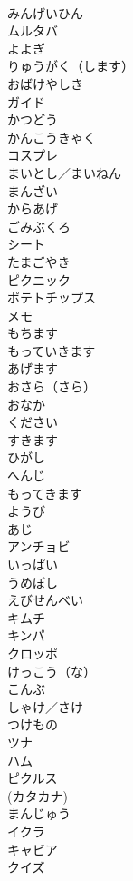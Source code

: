 \documentclass[8pt]{extreport}
\begin{document}
\begin{CJK}{UTF8}{min}
\\	みんげいひん	
\\	ムルタバ	
\\	よよぎ	
\\	りゅうがく（します）	
\\	おばけやしき	
\\	ガイド	
\\	かつどう	
\\	かんこうきゃく	
\\	コスプレ	
\\	まいとし／まいねん	
\\	まんざい	
\\	からあげ	
\\	ごみぶくろ	
\\	シート	
\\	たまごやき	
\\	ピクニック	
\\	ポテトチップス	
\\	メモ	
\\	もちます	
\\	もっていきます	
\\	あげます	
\\	おさら（さら）	
\\	おなか	
\\	ください	
\\	すきます	
\\	ひがし	
\\	へんじ	
\\	もってきます	
\\	ようび	
\\	あじ	
\\	アンチョビ	
\\	いっぱい	
\\	うめぼし	
\\	えびせんべい	
\\	キムチ	
\\	キンパ	
\\	クロッポ	
\\	けっこう（な）	
\\	こんぶ	
\\	しゃけ／さけ	
\\	つけもの	
\\	ツナ	
\\	ハム	
\\	ピクルス	
\\	(カタカナ)
\\	まんじゅう	
\\	イクラ	
\\	キャビア	
\\	クイズ	

\end{CJK}
\end{document}
